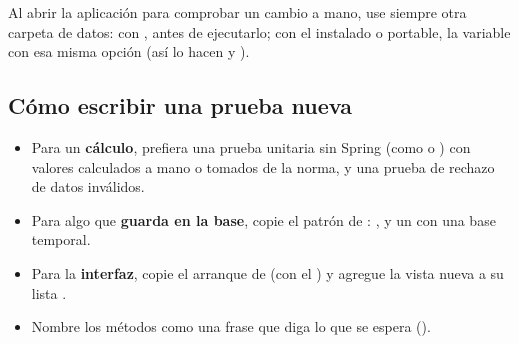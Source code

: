 Al abrir la aplicación para comprobar un cambio a mano, use siempre otra carpeta de datos: con
,  antes de
ejecutarlo; con el  instalado o portable, la variable  con esa misma opción (así lo
hacen  y ).

\subsection{Cómo escribir una prueba nueva}

\begin{itemize}
	\item Para un \textbf{cálculo}, prefiera una prueba unitaria sin Spring (como  o
	      ) con valores calculados a mano o tomados de la norma, y una prueba de rechazo de datos
	      inválidos.
	\item Para algo que \textbf{guarda en la base}, copie el patrón de :
	      ,
	       y un
	       con una base temporal.
	\item Para la \textbf{interfaz}, copie el arranque de  (con el ) y agregue la
	      vista nueva a su lista .
	\item Nombre los métodos como una frase que diga lo que se espera ().
\end{itemize}
